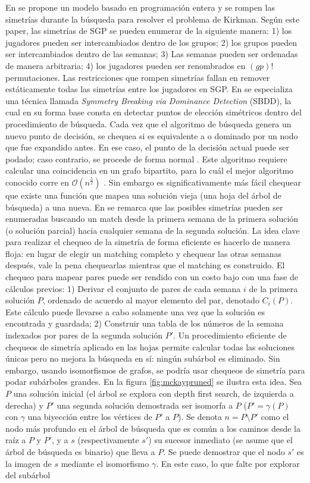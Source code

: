\documentclass[letter, 10pt]{article}
\begin{document}
En \cite{barnier2005solving} se propone un modelo basado en programación entera y se rompen las simetrías durante la búsqueda para resolver el problema de Kirkman. Según este paper, las simetrías de SGP se pueden enumerar de la siguiente manera: 1) los jugadores pueden ser intercambiados dentro de los grupos; 2) los grupos pueden ser intercambiados dentro de las semanas; 3) Las semanas pueden ser ordenadas de manera arbitraria; 4) los jugadores pueden ser renombrados en $(gp)!$ permutaciones. Las restricciones que rompen simetrías fallan en remover estáticamente todas las simetrías entre los jugadores en SGP. En \cite{barnier2005solving} se especializa una técnica llamada \textit{Symmetry Breaking via Dominance Detection} (SBDD), la cual en su forma base consta en detectar puntos de elección simétricos dentro del procedimiento de búsqueda. Cada vez que el algoritmo de búsqueda genera un nuevo punto de decisión, se chequea si es equivalente a o dominado por un nodo que fue expandido antes. En ese caso, el punto de la decisión actual puede ser podado; caso contrario, se procede de forma normal \cite{fahle2001sym}. Este algoritmo requiere calcular una coincidencia en un grafo bipartito, para lo cuál el mejor algoritmo conocido corre en $\mathcal{O}(n^{\frac{5}{2}})$ \cite{hopkroft1973n5}. Sin embargo es significativamente más fácil chequear que existe una función que mapea una solución vieja (una hoja del árbol de búsqueda) a una nueva. En \cite{fahle2001sym} se remarca que las posibles simetrías pueden ser enumeradas buscando un match desde la primera semana de la primera solución (o solución parcial) hacia cualquier semana de la segunda solución. La idea clave para realizar el chequeo de la simetría de forma eficiente es hacerlo de manera floja: en lugar de elegir un matching completo y chequear las otras semanas después, vale la pena chequearlas mientras que el matching es construido. El chequeo para mapear pares puede ser rendido con un costo bajo con una fase de cálculos previos: 1) Derivar el conjunto de pares de cada semana $i$ de la primera solución $P$, ordenado de acuerdo al mayor elemento del par, denotado $C_i(P)$. Este cálculo puede llevarse a cabo solamente una vez que la solución es encontrada y guardada; 2) Construir una tabla de los números de la semana indexados por pares de la segunda solución $P'$. Un procedimiento eficiente de chequeos de simetría aplicado en las hojas permite calcular todas las soluciones únicas pero no mejora la búsqueda en sí: ningún subárbol es eliminado. Sin embargo, usando isomorfismos de grafos, se podría usar chequeos de simetría para podar subárboles grandes. En la figura \ref{fig:mckaypruned} se ilustra esta idea. Sea $P$ una solución inicial (el árbol se explora con depth first search, de izquierda a derecha) y $P'$ una segunda solución demostrada ser isomorfa a $P$ ($P' = \gamma(P)$ con $\gamma$ una biyección entre los vértices de $P'$ a $P$). Se denota $n=P\setminus P'$ como el nodo más profundo en el árbol de búsqueda que es común a los caminos desde la raíz a $P$ y $P'$, y a $s$ (respectivamente $s'$) su sucesor inmediato (se asume que el árbol de búsqueda es binario) que lleva a $P$. Se puede demostrar que el nodo $s'$ es la imagen de $s$ mediante el isomorfismo $\gamma$. En este caso, lo que falte por explorar del subárbol 
\end{document}
